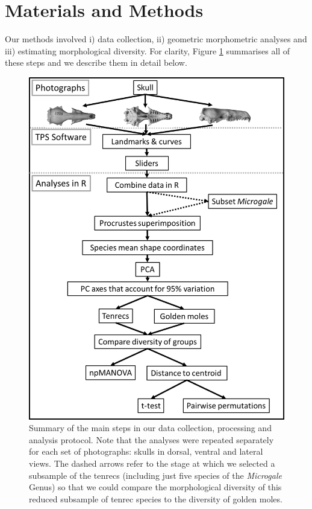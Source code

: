 \documentclass[12pt,a4paper]{article}
\begin{document}
\section{Materials and Methods}

	Our methods involved i) data collection, ii) geometric morphometric analyses and iii) estimating morphological diversity. For clarity,  Figure \ref{fig:flow} summarises all of these steps and we describe them in detail below.  	
	
	\begin{figure}[!htbp]
	\centering
	\includegraphics[width=1\linewidth,height=0.8\textheight]{figures/methods_flowchart_paper.png}
		
	\caption[Flowchart diagram of data collection and analysis]
		{Summary of the main steps in our data collection, processing and analysis protocol. Note that the analyses were repeated separately for each set of photographs: skulls in dorsal, ventral and lateral views. The dashed arrows refer to the stage at which we selected a subsample of the tenrecs (including just five species of the \textit{Microgale} Genus) so that we could compare the morphological diversity of this reduced subsample of tenrec species to the diversity of golden moles.}		
		\label{fig:flow}
		\end{figure}
\end{document}
